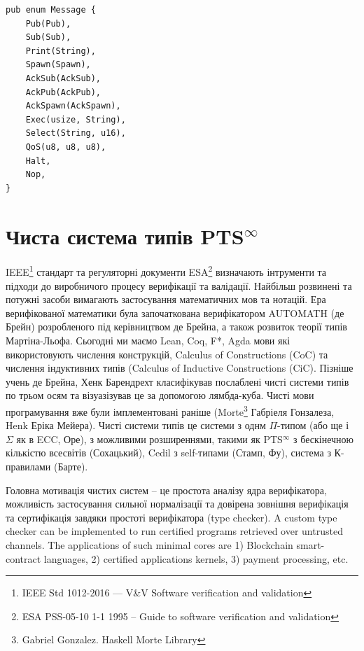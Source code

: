 \begin{definition}
\begin{definition}
\begin{definition}
\begin{definition}
\begin{lstlisting}
pub enum Message {
    Pub(Pub),
    Sub(Sub),
    Print(String),
    Spawn(Spawn),
    AckSub(AckSub),
    AckPub(AckPub),
    AckSpawn(AckSpawn),
    Exec(usize, String),
    Select(String, u16),
    QoS(u8, u8, u8),
    Halt,
    Nop,
}
\end{lstlisting}

\section{Чиста система типів PTS$^\infty$}

IEEE\footnote{IEEE Std 1012-2016  --- V\&V Software verification and validation} стандарт
та регуляторні документи ESA\footnote{ESA PSS-05-10 1-1 1995 -- Guide to software verification and validation}
визначають інтрументи та підходи до виробничого процесу верифікації та валідації.
Найбільш розвинені та потужні засоби вимагають застосування математичних мов та нотацій.
Ера верифікованої математики була започаткована верифікатором AUTOMATH\cite{deBruijn83} (де Брейн) розробленого
під керівництвом де Брейна, а також розвиток теорії типів Мартіна-Льофа\cite{Lof84}.
Сьогодні ми маємо Lean, Coq, F*, Agda мови які використовують числення
конструкцій, Calculus of Constructions\cite{Coq88} (CoC)
та числення індуктивних типів (Calculus of Inductive Constructions\cite{Pfenning89} (CiC).
Пізніше учень де Брейна, Хенк Барендрехт класифікував послаблені чисті
системи типів по трьом осям та візуазізував це за допомогою лямбда-куба\cite{Henk93}.
Чисті мови програмування вже були імплементовані раніше
(Morte\footnote{Gabriel Gonzalez. Haskell Morte Library} Габріеля Гонзалеза, Henk\cite{Erik97} Еріка Мейера).
Чисті системи типів це системи з однм $\Pi$-типом (або ще і $\Sigma$ як в ECC\cite{Ore92}, Оре),
з можливими розширеннями, такими як PTS$^\infty$ з бескінечною кількістю всесвітів\cite{Tonpa18} (Сохацький),
Cedil з self-типами\cite{Fu14}\cite{Stump17} (Стамп, Фу), система з К-правилами\cite{Barthe95} (Барте).

Головна мотивація чистих систем -- це простота аналізу ядра верифікатора,
можливість застосування сильної нормалізації та довірена зовнішня верифікація
та сертифікація завдяки простоті верифікатора (type checker).
A custom type checker can be implemented to run certified programs retrieved over untrusted channels.
The applications of such minimal cores are 1) Blockchain smart-contract languages, 2) certified applications kernels, 3) payment processing, etc.


\end{definition}
\end{definition}
\end{definition}
\end{definition}
